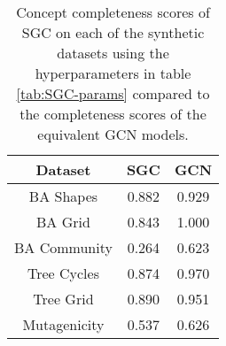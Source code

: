 \begin{table}[h]
    \centering
    \captionsetup{width=.9\textwidth}
    \begin{tabular}{c|c|c}
        \textbf{Dataset} &
        \textbf{SGC} &
        \textbf{GCN} \\
        \midrule
        BA Shapes       & 0.882 & 0.929 \\
        BA Grid         & 0.843 & 1.000 \\
        BA Community    & 0.264 & 0.623 \\
        Tree Cycles     & 0.874 & 0.970 \\
        Tree Grid       & 0.890 & 0.951 \\
        \midrule
        Mutagenicity    & 0.537 & 0.626 \\
    \end{tabular}
    \caption{Concept completeness scores of SGC on each of the synthetic datasets using the hyperparameters in table \ref{tab:SGC-params} compared to the completeness scores of the equivalent GCN models.}
    \label{tab:SGC-completeness}
\end{table}

